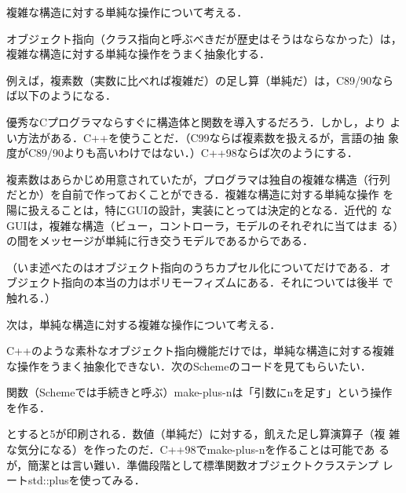 \documentclass[a5paper,twoside,fleqn,draft]{jsbook}
\begin{document}
複雑な構造に対する単純な操作について考える．

オブジェクト指向（クラス指向と呼ぶべきだが歴史はそうはならなかった）は，
複雑な構造に対する単純な操作をうまく抽象化する．

例えば，複素数（実数に比べれば複雑だ）の足し算（単純だ）は，C89/90なら
ば以下のようになる．


優秀なCプログラマならすぐに構造体と関数を導入するだろう．しかし，より
よい方法がある．C++を使うことだ．（C99ならば複素数を扱えるが，言語の抽
  象度がC89/90よりも高いわけではない．）C++98ならば次のようにする．


複素数はあらかじめ用意されていたが，プログラマは独自の複雑な構造（行列
だとか）を自前で作っておくことができる．複雑な構造に対する単純な操作
を陽に扱えることは，特にGUIの設計，実装にとっては決定的となる．近代的
なGUIは，複雑な構造（ビュー，コントローラ，モデルのそれぞれに当てはま
る）の間をメッセージが単純に行き交うモデルであるからである．

（いま述べたのはオブジェクト指向のうちカプセル化についてだけである．オ
ブジェクト指向の本当の力はポリモーフィズムにある．それについては後半
で触れる．）

次は，単純な構造に対する複雑な操作について考える．

C++のような素朴なオブジェクト指向機能だけでは，単純な構造に対する複雑
な操作をうまく抽象化できない．次のSchemeのコードを見てもらいたい．


関数（Schemeでは手続きと呼ぶ）make-plus-nは「引数にnを足す」という操作
を作る．


とすると5が印刷される．数値（単純だ）に対する，飢えた足し算演算子（複
  雑な気分になる）を作ったのだ．C++98でmake-plus-nを作ることは可能であ
るが，簡潔とは言い難い．準備段階として標準関数オブジェクトクラステンプ
レートstd::plusを使ってみる．
\end{document}
